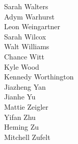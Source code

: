 \begin{multicols}{5}
{Sarah Walters\\
Adym Warhurst\\
Leon Weingartner\\
Sarah Wilcox\\
Walt Williams\\
Chance Witt\\
Kyle Wood\\
Kennedy Worthington\\
Jiazheng Yan\\
Jianhe Yu\\
Mattie Zeigler\\
Yifan Zhu\\
Heming Zu\\
Mitchell Zufelt\\
}\end{multicols}
\pagebreak


